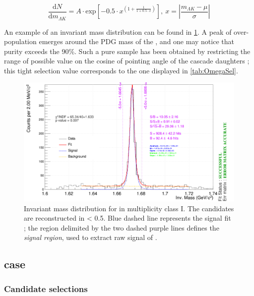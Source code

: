 \begin{equation}
\frac{\text{d}N}{\text{d}m_{\Lambda K}} = A \cdot \text{exp}[-0.5 \cdot x^{(1 + \frac{1}{1+0.5 \cdot x})}], \ x = \left | \frac{m_{\Lambda K} - \mu}{\sigma} \right |
\end{equation}\label{eq:OmegaSignal}

An example of an invariant mass distribution can be found in \fig \ref{fig:InvMassOmega}. A peak of over-population emerges around the PDG mass of the \rmOmega, and one may notice that purity exceeds the 90\%. Such a pure sample has been obtained by restricting the range of possible value on the cosine of pointing angle of the cascade daughters ; this tight selection value corresponds to the one displayed in \tab \ref{tab:OmegaSel}.

\begin{figure}[!hp]
\includegraphics[width=1.00\textwidth, angle=0, clip=true, trim=0cm 0 0 0]{Figures/Sec04_TrackSelections/InvMassOmega.png} 
\caption{Invariant mass distribution for \rmOmega in multiplicity class I. The candidates are reconstructed in \absrap < 0.5. Blue dashed line represents the signal fit ; the region delimited by the two dashed purple lines defines the \textit{signal region}, used to extract raw signal of \rmOmega.}
\label{fig:InvMassOmega}
\end{figure}

\subsection{\rmPhiMes case}
\label{sec:Section04.b-}

\subsubsection{Candidate selections}


